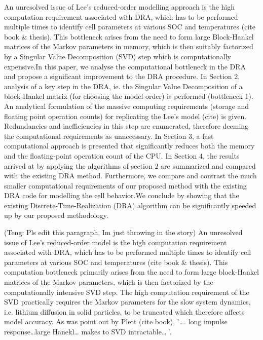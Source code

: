 An unresolved issue of Lee\textquoteright  s reduced-order modelling approach is
the high computation requirement associated with  DRA, which has to be performed
multiple  times to  identify cell  parameters  at various  SOC and  temperatures
(cite  book \&  thesis). This  bottleneck  arises from  the need  to form  large
Block-Hankel matrices of the Markov parameters in memory, which is then suitably
factorized by a Singular Value Decomposition (SVD) step which is computationally
expensive.In this paper, we analyse the  computational bottleneck in the DRA and
propose a significant  improvement to the DRA procedure. In  Section 2, analysis
of a key step in the DRA, ie. the Singular Value Decomposition of a block-Hankel
matrix (for choosing the model order) is performed (bottleneck 1). An analytical
formulation of  the massive computing  requirements (storage and  floating point
operation  counts) for  replicating  the Lee\textquoteright  s  model (cite)  is
given. Redundancies  and inefficiencies in  this step are  enumerated, therefore
deeming  the computational  requirements as  unnecessary. In  Section 3,  a fast
computational approach is  presented that significantly reduces  both the memory
and the  floating-point operation count  of the CPU.  In Section 4,  the results
arrived at by  applying the algorithms of section 2  are summarized and compared
with the  existing DRA  method. Furthermore,  we compare  and contrast  the much
smaller computational requirements of our  proposed method with the existing DRA
code for  modelling the cell behavior.We  conclude by showing that  the existing
Discrete-Time-Realization (DRA) algorithm can be significantly speeded up by our
proposed methodology.

(Teng: Pls  edit this paragraph,  Im just throwing  in the story)  An unresolved
issue  of  Lee\textquoteright s  reduced-order  model  is the  high  computation
requirement associated  with DRA, which  has to  be performed multiple  times to
identify cell parameters at various SOC  and temperatures (cite book \& thesis).
This  computation  bottleneck primarily  arises  from  the  need to  form  large
block-Hankel matrices of the Markov parameters,  which is then factorized by the
computationally intensive SVD step. The  high computation requirement of the SVD
practically requires  the Markov parameters  for the slow system  dynamics, i.e.
lithium diffusion  in solid particles,  to be truncated which  therefore affects
model accuracy. As  was point out by Plett (cite  book), \textquoteright \dots .
long  impulse response\dots  large Hanekl\dots{}  makes to  SVD intractable\dots
\textquoteright .


